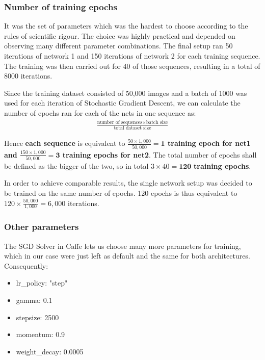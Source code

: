 \documentclass[a4paper, 12pt]{article}
\numberwithin{equation}{section}
\begin{document}
	\subsubsection{Number of training epochs}
	
	It was the set of parameters which was the hardest to choose according to the rules of scientific rigour. The choice was highly practical and depended on observing many different parameter combinations. The final setup ran 50 iterations of network 1 and 150 iterations of network 2 for each training sequence. The training was then carried out for 40 of those sequences, resulting in a total of 8000 iterations.
	
	Since the training dataset consisted of 50,000 images and a batch of 1000 was used for each iteration of Stochastic Gradient Descent, we can calculate the number of epochs ran for each of the nets in one sequence as:
	\begin{align}
		\frac{\text{number of sequences} \times \text{batch size}}{\text{total dataset size}}
	\end{align}
	
	Hence \textbf{each sequence} is equivalent to \textbf{$\frac{50\times1,000}{50,000}=\boldsymbol1$ training epoch for net1 and $\frac{150\times1,000}{50,000}=\boldsymbol3$ training epochs for net2}. The total number of epochs shall be defined as the bigger of the two, so in total $3\times40=\boldsymbol{120}$ \textbf{training epochs}. 
	
	In order to achieve comparable results, the single network setup was decided to be trained on the same number of epochs. 120 epochs is thus equivalent to $120\times\frac{50,000}{1,000}=6,000$ iterations.	
	
	\subsubsection{Other parameters}
	
	The SGD Solver in Caffe lets us choose many more parameters for training, which in our case were just left as default and the same for both architectures. Consequently:
	\begin{itemize}
		\item lr\_policy: "step"
		\item gamma: 0.1
		\item stepsize: 2500
		\item momentum: 0.9
		\item weight\_decay: 0.0005
	\end{itemize}
	
\end{document}
